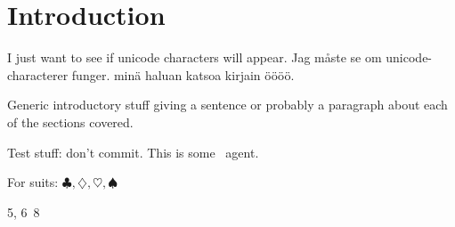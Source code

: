 \section{Introduction}
\label{sec:intro}

I just want to see if unicode characters will appear.
Jag måste se om unicode-characterer funger.
minä haluan katsoa kirjain öööö.

Generic introductory stuff giving a sentence or probably a paragraph about
each of the sections covered.

Test stuff:
don't commit.
This is some \learned\ agent.

For suits: $\clubsuit, \diamondsuit, \heartsuit, \spadesuit$

5\clubs, 6\diamonds\ 8\spades







